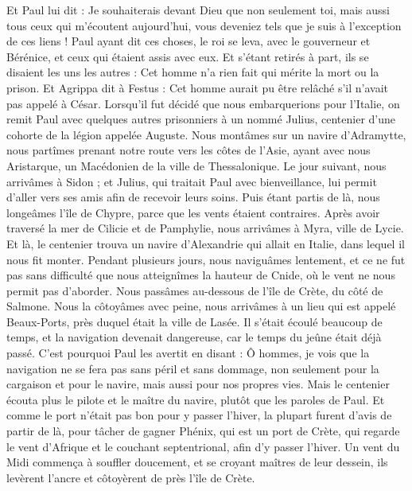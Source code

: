 \begin{multicols}{2}
Et Paul lui dit : Je souhaiterais devant Dieu que non seulement toi, mais aussi tous ceux qui m'écoutent aujourd'hui, vous deveniez tels que je suis à l’exception de ces liens !
Paul ayant dit ces choses, le roi se leva, avec le gouverneur et Bérénice, et ceux qui étaient assis avec eux.
Et s’étant retirés à part, ils se disaient les uns les autres : Cet homme n'a rien fait qui mérite la mort ou la prison.
Et Agrippa dit à Festus : Cet homme aurait pu être relâché s'il n'avait pas appelé à César.
\VerseOne{}Lorsqu’il fut décidé que nous embarquerions pour l’Italie, on remit Paul avec quelques autres prisonniers à un nommé Julius, centenier d'une cohorte de la légion appelée Auguste.
Nous montâmes sur un navire d'Adramytte, nous partîmes prenant notre route vers les côtes de l'Asie, ayant avec nous Aristarque, un Macédonien de la ville de Thessalonique.
Le jour suivant, nous arrivâmes à Sidon ; et Julius, qui traitait Paul avec bienveillance, lui permit d'aller vers ses amis afin de recevoir leurs soins.
Puis étant partis de là, nous longeâmes l’île de Chypre, parce que les vents étaient contraires.
Après avoir traversé la mer de Cilicie et de Pamphylie, nous arrivâmes à Myra, ville de Lycie.
Et là, le centenier trouva un navire d'Alexandrie qui allait en Italie, dans lequel il nous fit monter.
Pendant plusieurs jours, nous naviguâmes lentement, et ce ne fut pas sans difficulté que nous atteignîmes la hauteur de Cnide, où le vent ne nous permit pas d’aborder. Nous passâmes au-dessous de l’île de Crète, du côté de Salmone.
Nous la côtoyâmes avec peine, nous arrivâmes à un lieu qui est appelé Beaux-Ports, près duquel était la ville de Lasée.
Il s’était écoulé beaucoup de temps, et la navigation devenait dangereuse, car le temps du jeûne était déjà passé.
C’est pourquoi Paul les avertit en disant : Ô hommes, je vois que la navigation ne se fera pas sans péril et sans dommage, non seulement pour la cargaison et pour le navire, mais aussi pour nos propres vies.
Mais le centenier écouta plus le pilote et le maître du navire, plutôt que les paroles de Paul.
Et comme le port n'était pas bon pour y passer l'hiver, la plupart furent d'avis de partir de là, pour tâcher de gagner Phénix, qui est un port de Crète, qui regarde le vent d’Afrique et le couchant septentrional, afin d’y passer l'hiver.
Un vent du Midi commença à souffler doucement, et se croyant maîtres de leur dessein, ils levèrent l’ancre et côtoyèrent de près l’île de Crète.

\end{multicols}
